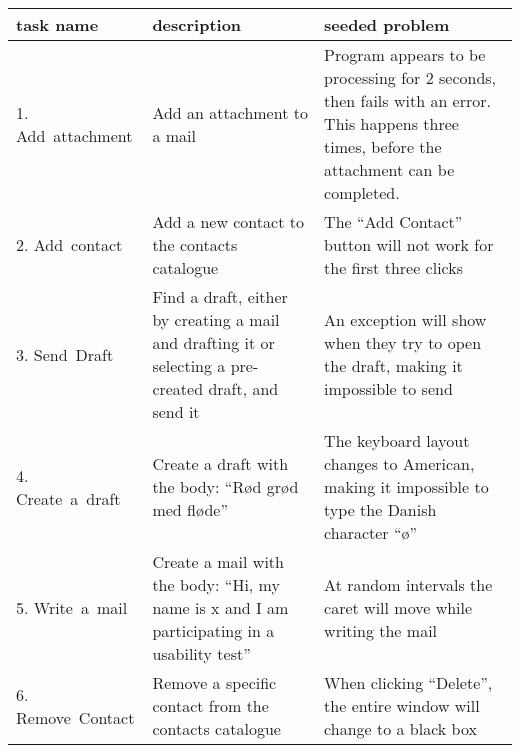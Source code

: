 \begin{table}[h]
  \centering
  \begin{tabular}[c]{|p{60pt}|p{80pt}|p{80pt}|}
    \hline
    task name                         & description                                                                                                                    & seeded problem                                                                                                                                      \\ \hline
    \small{1. Add~attachment}         & \small{Add an attachment to a mail}                                                                                            & \small{Program appears to be processing for 2 seconds, then fails with an error. This happens three times, before the attachment can be completed.} \\ \hline
    \small{2. Add~contact}            & \small{Add a new contact to the contacts catalogue}                                                                            & \small{The ``Add Contact'' button will not work for the first three clicks}                                                                         \\ \hline
    \small{3. Send~Draft}             & \small{Find a draft, either by creating a mail and drafting it or selecting a pre-created draft, and send it}                  & \small{An exception will show when they try to open the draft, making it impossible to send}                                                        \\ \hline
    \small{4. Create~a~draft}         & \small{Create a draft with the body: ``Rød grød med fløde''}                                                                   & \small{The keyboard layout changes to American, making it impossible to type the Danish character ``ø''}                                            \\ \hline
    \small{5. Write~a~mail}           & \small{Create a mail with the body: ``Hi, my name is x and I am participating in a usability test''}                           & \small{At random intervals the caret will move while writing the mail}                                                                              \\ \hline
    \small{6. Remove~Contact}         & \small{Remove a specific contact from the contacts catalogue}                                                                  & \small{When clicking ``Delete'', the entire window will change to a black box}                                                                      \\ \hline

\end{tabular}
\end{table}
